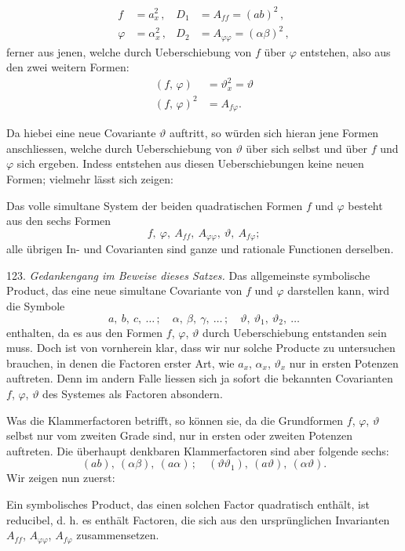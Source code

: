 \documentclass[11pt]{article}
\providecommand{\weberpage}[1]{}
\providecommand{\weq}[2]{\begin{equation}\tag{#1}#2\end{equation}}
\begin{document}
\weberpage{139}
\[
\begin{aligned}
f &= a_x^2\,, & D_1 &= A_{ff} = (ab)^2\,, \\
\varphi &= \alpha_x^2\,, & D_2 &= A_{\varphi\varphi} = (\alpha\beta)^2\,,
\end{aligned}
\]
ferner aus jenen, welche durch Ueberschiebung von $f$ über $\varphi$ entstehen, also aus den zwei weitern Formen:
\[
\begin{aligned}
(f,\,\varphi) &= \vartheta_x^2 = \vartheta \\
(f,\,\varphi)^2 &= A_{f\varphi}.
\end{aligned}
\]

Da hiebei eine neue Covariante $\vartheta$ auftritt, so würden sich hieran jene Formen anschliessen, welche durch Ueberschiebung von $\vartheta$ über sich selbst und über $f$ und $\varphi$ sich ergeben. Indess entstehen aus diesen Ueberschiebungen keine neuen Formen; vielmehr lässt sich zeigen:

\glqq Das volle simultane System der beiden quadratischen Formen $f$ und $\varphi$ besteht aus den sechs Formen
\[
f,\ \varphi,\ A_{ff},\ A_{\varphi\varphi},\ \vartheta,\ A_{f\varphi};
\]
alle übrigen In- und Covarianten sind ganze und rationale Functionen derselben.\grqq{}

123. \textit{Gedankengang im Beweise dieses Satzes.} Das allgemeinste symbolische Product, das eine neue simultane Covariante von $f$ und $\varphi$ darstellen kann, wird die Symbole
\[
a,\ b,\ c,\ \ldots\,;\quad \alpha,\ \beta,\ \gamma,\ \ldots\,;\quad \vartheta,\ \vartheta_1,\ \vartheta_2,\ \ldots
\]
enthalten, da es aus den Formen $f$, $\varphi$, $\vartheta$ durch Ueberschiebung entstanden sein muss. Doch ist von vornherein klar, dass wir nur solche Producte zu untersuchen brauchen, in denen die Factoren erster Art, wie $a_x$, $\alpha_x$, $\vartheta_x$ nur in ersten Potenzen auftreten. Denn im andern Falle liessen sich ja sofort die bekannten Covarianten $f$, $\varphi$, $\vartheta$ des Systemes als Factoren absondern.

Was die Klammerfactoren betrifft, so können sie, da die Grundformen $f$, $\varphi$, $\vartheta$ selbst nur vom zweiten Grade sind, nur in ersten oder zweiten Potenzen auftreten. Die überhaupt denkbaren Klammerfactoren sind aber folgende sechs:
\weq{A}{(ab),\ (\alpha\beta),\ (a\alpha)\,;\quad (\vartheta\vartheta_1),\ (a\vartheta),\ (\alpha\vartheta).}
Wir zeigen nun zuerst:

\glqq Ein symbolisches Product, das einen solchen Factor quadratisch enthält, ist reducibel, d. h. es enthält Factoren, die sich aus den ursprünglichen Invarianten $A_{ff}$, $A_{\varphi\varphi}$, $A_{f\varphi}$ zusammensetzen.\grqq{}
\end{document}

